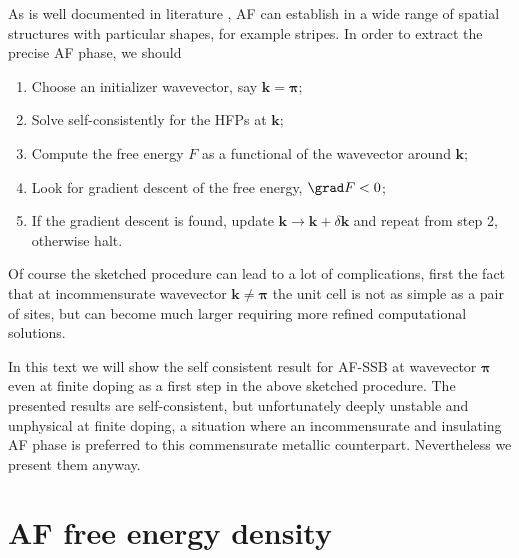 As is well documented in literature \cite{wietek2021stripes}, AF can establish in a wide range of spatial structures with particular shapes, for example stripes. In order to extract the precise AF phase, we should
\begin{enumerate}
	\item Choose an initializer wavevector, say $\mathbf{k}=\bm{\pi}$;
	\item Solve self-consistently for the HFPs at $\mathbf{k}$;
	\item Compute the free energy $F$ as a functional of the wavevector around $\mathbf{k}$;
	\item Look for gradient descent of the free energy, $\grad F < 0$;
	\item If the gradient descent is found, update $\mathbf{k} \to \mathbf{k} + \delta \mathbf{k}$ and repeat from step 2, otherwise halt.
\end{enumerate}
Of course the sketched procedure can lead to a lot of complications, first the fact that at incommensurate wavevector $\mathbf{k} \neq \bm{\pi}$ the unit cell is not as simple as a pair of sites, but can become much larger requiring more refined computational solutions.

In this text we will show the self consistent result for AF-SSB at wavevector $\bm{\pi}$ even at finite doping as a first step in the above sketched procedure. The presented results are self-consistent, but unfortunately deeply unstable and unphysical at finite doping, a situation where an incommensurate and insulating AF phase is preferred to this commensurate metallic counterpart. Nevertheless we present them anyway.

\section{AF free energy density}\label{sec:af-free-energy}

